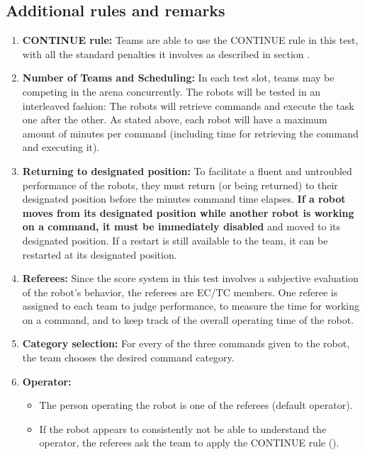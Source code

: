 \subsection{Additional rules and remarks}
\label{sec:eegpsr-remarks}
\begin{enumerate}
	\item \textbf{CONTINUE rule:} Teams are able to use the CONTINUE rule in this test, with all the standard penalties it involves as described in section .
	\\

	\item \textbf{Number of Teams and Scheduling:} In each test slot, \eegpsrTeams teams may be competing in the arena concurrently. The robots will be tested in an interleaved fashion: The robots will retrieve commands and execute the task one after the other. As stated above, each robot will have a maximum amount of \eegpsrMaxCmdTime minutes per command (including time for retrieving the command and executing it). \\
	
	\item \textbf{Returning to designated position:} To facilitate a fluent and untroubled performance of the robots, they must return (or being returned) to their designated position before the \eegpsrMaxCmdTime minutes command time elapses. \textbf{If a robot moves from its designated position while another robot is working on a command, it must be immediately disabled} and moved to its designated position. If a restart is still available to the team, it can be restarted at its designated position. \\

	\item \textbf{Referees:} Since the score system in this test involves a subjective evaluation of the robot's behavior, the referees are EC/TC members. One referee is assigned to each team to judge performance, to measure the time for working on a command, and to keep track of the overall operating time of the robot. \\

	\item \textbf{Category selection:} For every of the three commands given to the robot, the team chooses the desired command category.\\

	\item \textbf{Operator:}
	\begin{itemize}
		\item The person operating the robot is one of the referees (default operator).
		\item If the robot appears to consistently not be able to understand the operator, the referees ask the team to apply the CONTINUE rule ().
	\end{itemize}


\end{enumerate}
